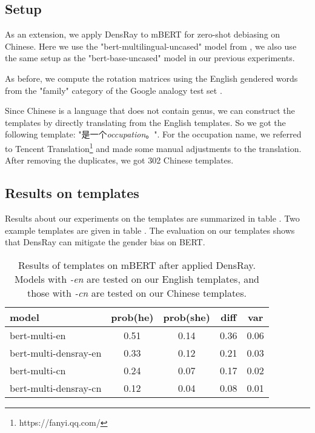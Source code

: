 \subsection{Setup}
As an extension, we apply DensRay to mBERT for zero-shot debiasing on Chinese. Here we use the "bert-multilingual-uncased" model from \citep{wolf2019huggingfaces}, we also use the same setup as the "bert-base-uncased" model in our previous experiments.

As before, we compute the rotation matrices using the English gendered words from the "family" category of the Google analogy test set \citep{mikolov2013efficient}.

Since Chinese is a language that does not contain genus, we can construct the templates by directly translating from the English templates. So we got the following template: "\text{[MASK]}是一个\textit{occupation}。". For the occupation name, we referred to Tencent Translation\footnote{https://fanyi.qq.com/} and made some manual adjustments to the translation. After removing the duplicates, we got 302 Chinese templates.

\subsection{Results on templates}
Results about our experiments on the templates are summarized in table . Two example templates are given in table . The evaluation on our templates shows that DensRay can mitigate the gender bias on BERT.
\begin{table}[ht]
\centering
\footnotesize
\begin{tabular}{lcccc}
\hline
model & prob(he) & prob(she) & diff & var\\
\hline
\scriptsize bert-multi-en 
& 0.51 & 0.14 & 0.36 & 0.06 \\
\scriptsize 
bert-multi-densray-en & 0.33 & 0.12 & 0.21 & 0.03 \\
\scriptsize bert-multi-cn 
& 0.24 & 0.07 & 0.17 & 0.02 \\
\scriptsize bert-multi-densray-cn 
& 0.12 & 0.04 & 0.08 & 0.01\\
\hline
\end{tabular}
\caption{
Results of templates on mBERT after applied DensRay. Models with \textit{-en} are tested on our English templates, and those with \textit{-cn} are tested on our Chinese templates.}
\end{table}

